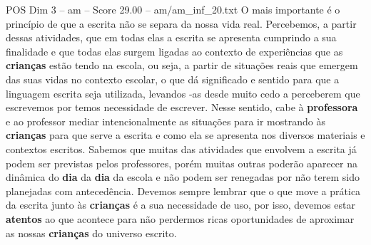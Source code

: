 \begin{textsample}{POS Dim 3 – am – Score 29.00 – am/am\_inf\_20.txt}
O mais importante é o princípio de que a escrita não se separa da nossa vida real.
Percebemos, a partir dessas atividades, que em todas elas a escrita se apresenta cumprindo a sua finalidade e que todas elas surgem ligadas ao contexto de experiências que as \textbf{crianças} estão tendo na escola, ou seja, a partir de situações reais que emergem das suas vidas no contexto escolar, o que dá significado e sentido para que a linguagem escrita seja utilizada, levandos -as desde muito cedo a perceberem que escrevemos por temos necessidade de escrever.
Nesse sentido, cabe à \textbf{professora} e ao professor mediar intencionalmente as situações para ir mostrando às \textbf{crianças} para que serve a escrita e como ela se apresenta nos diversos materiais e contextos escritos.
Sabemos que muitas das atividades que envolvem a escrita já podem ser previstas pelos professores, porém muitas outras poderão aparecer na dinâmica do \textbf{dia} da \textbf{dia} da escola e não podem ser renegadas por não terem sido planejadas com antecedência.
Devemos sempre lembrar que o que move a prática da escrita junto às \textbf{crianças} é a sua necessidade de uso, por isso, devemos estar \textbf{atentos} ao que acontece para não perdermos ricas oportunidades de aproximar as nossas \textbf{crianças} do universo escrito.

\end{textsample}
